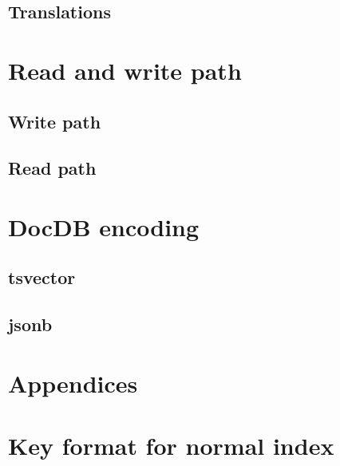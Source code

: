 \documentclass[11pt]{article}
\begin{document}
\hypertarget{translations}{%
\subsection{Translations}\label{translations}}


\newpage
\hypertarget{read-and-write-path}{%
\section{Read and write path}\label{read-and-write-path}}

\hypertarget{write-path}{%
\subsection{Write path}\label{write-path}}


\hypertarget{read-path}{%
\subsection{Read path}\label{read-path}}


\newpage
\hypertarget{docdb-encoding}{%
\section{DocDB encoding}\label{docdb-encoding}}


\hypertarget{tsvector}{%
\subsection{tsvector}\label{tsvector}}


\hypertarget{jsonb}{%
\subsection{jsonb}\label{jsonb}}


\newpage
\appendix
{}
\hypertarget{appendices}{%
\section*{Appendices}\label{appendices}}

\hypertarget{key-format-for-normal-index}{%
\section{Key format for normal index}\label{key-format-for-normal-index}}

\end{document}
